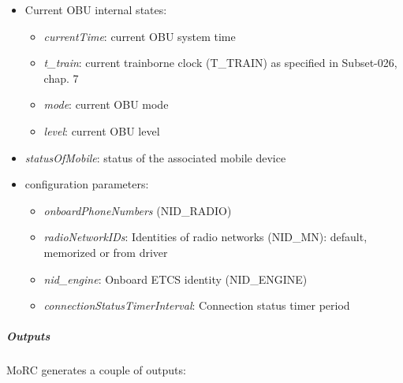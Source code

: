 \begin{itemize}
  \item Current OBU internal states:
  
  \begin{itemize}
   \item \textit{currentTime}: current OBU system time
   \item \textit{t\_train}: current trainborne clock (T\_TRAIN) as specified in Subset-026, chap. 7
   \item \textit{mode}: current OBU mode
   \item \textit{level}: current OBU level
  \end{itemize}

  \item \textit{statusOfMobile}: status of the associated mobile device
  
  \item configuration parameters:
  
   \begin{itemize}
    \item \textit{onboardPhoneNumbers} (NID\_RADIO)
    \item \textit{radioNetworkIDs}: Identities of radio networks (NID\_MN): default, memorized or from driver  
    \item \textit{nid\_engine}: Onboard ETCS identity (NID\_ENGINE)
    \item \textit{connectionStatusTimerInterval}: Connection status timer period 
   \end{itemize} 

 \end{itemize} 

\subparagraph{Outputs}

MoRC generates a couple of outputs: 

